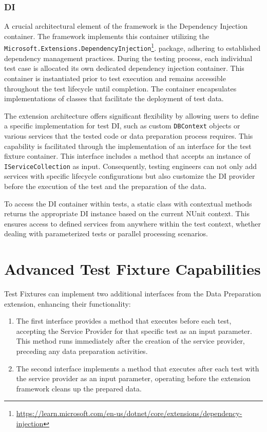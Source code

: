 \subsubsection{\acf{DI}}
A crucial architectural element of the framework is the Dependency Injection container. The framework implements this container utilizing the \texttt{Microsoft.Extensions.DependencyInjection}\footnote{\href{https://learn.microsoft.com/en-us/dotnet/core/extensions/dependency-injection}{https://learn.microsoft.com/en-us/dotnet/core/extensions/dependency-injection}}. package, adhering to established dependency management practices. During the testing process, each individual test case is allocated its own dedicated dependency injection container. This container is instantiated prior to test execution and remains accessible throughout the test lifecycle until completion. The container encapsulates implementations of classes that facilitate the deployment of test data.

The extension architecture offers significant flexibility by allowing users to define a specific implementation for test \ac{DI}, such as custom \texttt{DBContext} objects or various services that the tested code or data preparation process requires. This capability is facilitated through the implementation of an interface for the test fixture container. This interface includes a method that accepts an instance of \texttt{IServiceCollection} as input. Consequently, testing engineers can not only add services with specific lifecycle configurations but also customize the \ac{DI} provider before the execution of the test and the preparation of the data. 

To access the DI container within tests, a static class with contextual methods returns the appropriate DI instance based on the current NUnit context. This ensures access to defined services from anywhere within the test context, whether dealing with parameterized tests or parallel processing scenarios.

\section{Advanced Test Fixture Capabilities}

Test Fixtures can implement two additional interfaces from the Data Preparation extension, enhancing their functionality:

\begin{enumerate}
    \item The first interface provides a method that executes before each test, accepting the Service Provider for that specific test as an input parameter. This method runs immediately after the creation of the service provider, preceding any data preparation activities.
    
    \item The second interface implements a method that executes after each test with the service provider as an input parameter, operating before the extension framework cleans up the prepared data.
\end{enumerate}

